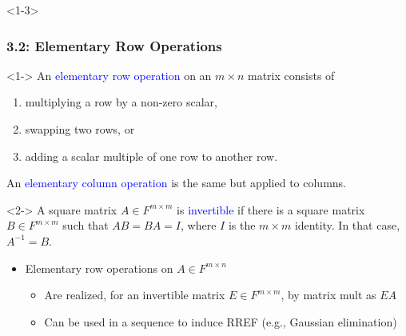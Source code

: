 \documentclass[10pt,english,aspectratio=169]{beamer}
\begin{document}
\begin{frame}

\end{frame}

\begin{frame}<1-3> \frametitle{3.2: Elementary Row Operations}

\vspace{-1.5mm}

\begin{definition}<1->
An \textcolor{blue}{elementary row operation} on an $m \times n$ matrix consists of
\begin{enumerate}
\setlength\itemsep{0.5mm}
\item multiplying a row by a non-zero scalar,
\item swapping two rows, or
\item adding a scalar multiple of one row to another row.
\end{enumerate}
An \textcolor{blue}{elementary column operation} is the same but applied to columns.
\end{definition}


\begin{definition}<2->
A square matrix $A \in F^{m\times m}$ is \textcolor{blue}{invertible} if there is a square matrix $B \in F^{m\times m}$ such that $AB=BA=I$, where $I$ is the $m\!\times\! m$ identity.  In that case, $A^{-1}=B$.
\end{definition}

\vspace{1mm}
\begin{itemize}
  \item<3-> Elementary row operations on $A\in F^{m\times n}$ \vspace{1mm}
  \begin{itemize}
    \setlength{\itemsep}{1.5mm}
    \item <3-> Are realized, for an invertible matrix $E \in F^{m\times m}$, by matrix mult as $EA$
    \item <3-> Can be used in a sequence to induce RREF (e.g., Gaussian elimination)
  \end{itemize}
\end{itemize}


\end{frame}
\end{document}
